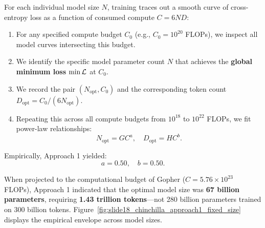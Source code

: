 \documentclass[../../main.tex]{subfiles}
\begin{document}
For each individual model size $N$, training traces out a smooth curve of cross-entropy loss as a function of consumed compute $C = 6ND$:
\begin{enumerate}
    \item For any specified compute budget $C_0$ (e.g., $C_0 = 10^{20}$ FLOPs), we inspect all model curves intersecting this budget.
    \item We identify the specific model parameter count $N$ that achieves the \textbf{global minimum loss} $\min \mathcal{L}$ at $C_0$.
    \item We record the pair $(N_{\text{opt}}, C_0)$ and the corresponding token count $D_{\text{opt}} = C_0 / (6 N_{\text{opt}})$.
    \item Repeating this across all compute budgets from $10^{18}$ to $10^{22}$ FLOPs, we fit power-law relationships:
    \begin{equation}
    \label{eq:approach1_fits}
    N_{\text{opt}} = G C^a, \quad D_{\text{opt}} = H C^b.
    \end{equation}
\end{enumerate}

Empirically, Approach 1 yielded:
\begin{equation}
a = 0.50, \quad b = 0.50.
\end{equation}

When projected to the computational budget of Gopher ($C = 5.76 \times 10^{23}$ FLOPs), Approach 1 indicated that the optimal model size was \textbf{67 billion parameters}, requiring \textbf{1.43 trillion tokens}---not 280 billion parameters trained on 300 billion tokens. Figure~\ref{fig:slide18_chinchilla_approach1_fixed_size} displays the empirical envelope across model sizes.
\end{document}
